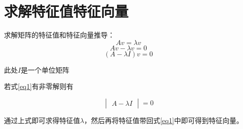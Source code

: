 \documentclass[12pt, a4paper, oneside]{ctexbook}
\begin{document}
\section{求解特征值特征向量}

求解矩阵的特征值和特征向量推导：
\begin{equation}
    Av=\lambda v
\end{equation}
\begin{equation} 
    Av-\lambda v=0
\end{equation}
\begin{equation}\label{eq1}
    (A-\lambda I)v=0
\end{equation}

此处$I$是一个单位矩阵

若式\ref{eq1}有非零解则有

$$
\begin{vmatrix}
    A-\lambda I
\end{vmatrix}
=0
$$

通过上式即可求得特征值$\lambda$，然后再将特征值带回式\ref{eq1}中即可得到特征向量。
\end{document}
